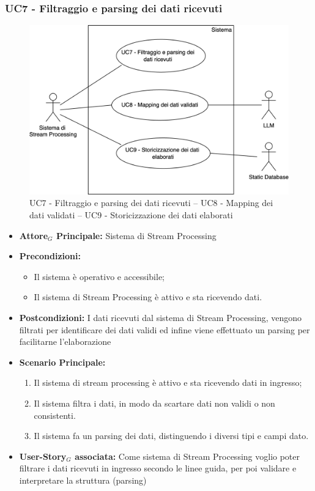 \documentclass[11pt]{article}
\begin{document}
\begin{justify}
\subsubsection{\textbf{UC7 - Filtraggio e parsing dei dati ricevuti}}
\begin{figure}[H]
    \centering
    \includegraphics[width=0.7\linewidth]{UC789image.png}
    \caption{UC7 - Filtraggio e parsing dei dati ricevuti -- UC8 - Mapping dei dati validati -- UC9 - Storicizzazione dei dati elaborati}
    \label{fig:UC789}
\end{figure}
\label{UC7}
\begin{itemize}
    \item \textbf{Attore$_G$ Principale:} Sistema di Stream Processing
    \item \textbf{Precondizioni:} 
        \begin{itemize}
          \item Il sistema è operativo e accessibile;
            \item Il sistema di Stream Processing è attivo e sta ricevendo dati.
        \end{itemize}
      \item \textbf{Postcondizioni:} I dati ricevuti dal sistema di Stream Processing, vengono filtrati per identificare dei dati validi ed infine viene effettuato un parsing per facilitarne l'elaborazione\\
    \item \textbf{Scenario Principale:} 
        \begin{enumerate}
        \item Il sistema di stream processing è attivo e sta ricevendo dati in ingresso;
        \item Il sistema filtra i dati, in modo da scartare dati non validi o non consistenti.
        \item Il sistema fa un parsing dei dati, distinguendo i diversi tipi e campi dato.
        \end{enumerate}
    \item \textbf{User-Story$_G$ associata:} Come sistema di Stream Processing voglio poter filtrare i dati ricevuti in ingresso secondo le linee guida, per poi validare e interpretare la struttura (parsing)
\end{itemize}



\end{justify}
\end{document}
